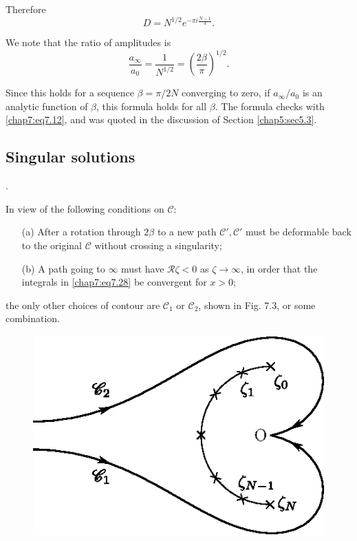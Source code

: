 {{Therefore
\begin{equation}
D=N^{1/2} e^{-\pi i\frac{N-1}{4}}.\tag{7.36}\label{chap7:eq7.36}
\end{equation}

We note that the ratio of amplitudes is 
\begin{equation}
\frac{a_\infty}{a_0}=\frac{1}{N^{1/2}}=\left(\frac{2\beta}{\pi}\right)^{1/2}. \tag{7.37}\label{chap7:eq7.37}
\end{equation}

Since this holds for a sequence $\beta =\pi/2N$ converging to zero, if $a_\infty/a_0$ is an analytic function of $\beta$, this formula holds for all $\beta$. The formula checks with \eqref{chap7:eq7.12}, and was quoted in the discussion of Section \ref{chap5:sec5.3}. 

\subsection*{\bf Singular solutions}.\pageoriginale

In view of the following conditions on $\mathscr{C}$:
\begin{enumerate}
\item [(a)] After a rotation through $2\beta$ to a new path $\mathscr{C'},\mathscr{C'}$ must be deformable back to the original $\mathscr{C}$ without crossing a singularity;
\item [(b)] A path going to $\infty$ must have $\mathscr{R}\zeta <0$ as $\zeta\to\infty$, in order that the integrals in \eqref{chap7:eq7.28} be convergent for $x>0$;
\end{enumerate}
the only other choices of contour are $\mathscr{C}_1$ or $\mathscr{C}_2$, shown in Fig. 7.3, or some combination. 
\begin{figure}[H]
\centering
\includegraphics{figures/fig61-7.3.eps}
\caption{}
\label{chap1:fig7.3}
\end{figure}

}}
